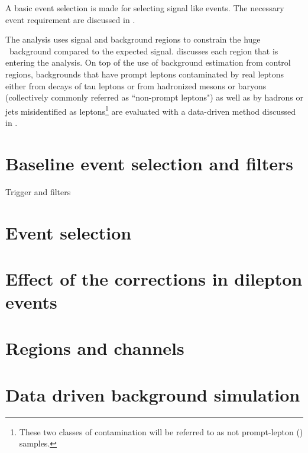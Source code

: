  A basic event selection is made for selecting signal like events. The necessary event requirement are discussed in . 

The analysis uses signal and background regions to constrain the huge \SM\ background compared to the expected signal.  discusses each region that is entering the analysis. On top of the use of background estimation from control regions, backgrounds that have  prompt leptons  contaminated by real leptons either
from decays of tau leptons or from hadronized mesons or baryons
(collectively commonly referred as ``non-prompt leptons") as well as by
hadrons or jets misidentified as leptons\footnote{These two classes
	of contamination will be referred to as not prompt-lepton (\NPL) samples.} are
evaluated with a data-driven method discussed in .
\section{Baseline event selection and filters}
Trigger and filters
\section{Event selection}
\label{sec:selection}
\section{Effect of the corrections in dilepton events}
\section{Regions and channels}
\label{sec:regions}
\section{Data driven background simulation}
\label{sec:NPL}